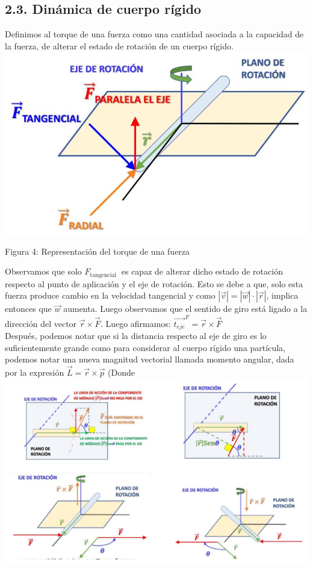 \documentclass[10pt]{article}
\begin{document}
\subsection*{2.3. Dinámica de cuerpo rígido}
Definimos al torque de una fuerza como una cantidad asociada a la capacidad de la fuerza, de alterar el estado de rotación de un cuerpo rígido.\\
\includegraphics[scale = 0.15, center]{2025_04_01_ea720b93e8ebb5d0c6aeg-06}

Figura 4: Representación del torque de una fuerza

Observamos que solo $F_{\text {tangencial }}$ es capaz de alterar dicho estado de rotación respecto al punto de aplicación y el eje de rotación. Esto se debe a que, solo esta fuerza produce cambio en la velocidad tangencial y como $|\vec{v}|=|\vec{w}| \cdot|\vec{r}|$, implica entonces que $\vec{w}$ aumenta. Luego observamos que el sentido de giro está ligado a la dirección del vector $\vec{r} \times \vec{F}$. Luego afirmamos: ${\overrightarrow{t_{e j e}}}^{F}=\vec{r} \times \vec{F}$\\
Después, podemos notar que si la distancia respecto al eje de giro es lo suficientemente grande como para considerar al cuerpo rígido una partícula, podemos notar una nueva magnitud vectorial llamada momento angular, dada por la expresión $\vec{L}=\vec{r} \times \vec{p}$ (Donde\\
\includegraphics[scale = 0.15, center]{2025_04_01_ea720b93e8ebb5d0c6aeg-07(1)}
\end{document}

